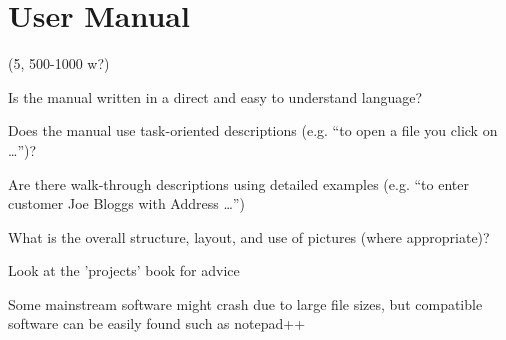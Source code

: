 \newpage
\section{User Manual}
\label{sec:user_manual}


(5, 500-1000 w?)

Is the manual written in a direct and easy to understand language?

Does the manual use task-oriented descriptions (e.g. “to open a file you click
on …”)?

Are there walk-through descriptions using detailed examples (e.g. “to enter
customer Joe Bloggs with Address …”)

What is the overall structure, layout, and use of pictures (where appropriate)?

Look at the 'projects' book for advice




Some mainstream software might crash due to large file sizes, but compatible 
software can be easily found such as notepad++ 

